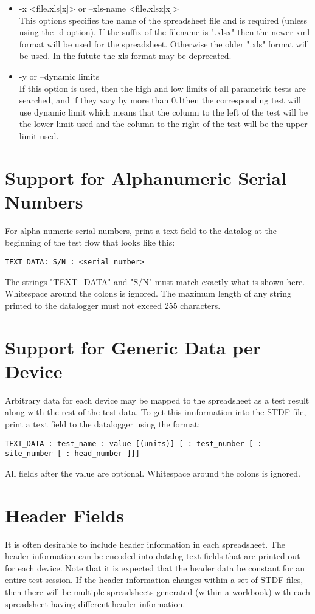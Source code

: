 \documentclass[letterpaper]{article}
\begin{document}
\begin{itemize}
\item -x <file.xls[x]> or --xls-name <file.xlsx[x]>\\
This options specifies the name of the spreadsheet file and is required (unless using the -d option).
If the suffix of the filename is ".xlsx" then the newer xml format will be used for the spreadsheet.
Otherwise the older ".xls" format will be used.  In the futute the xls format may be deprecated.
\item -y or --dynamic limits\\
If this option is used, then the high and low limits of all parametric tests are
searched, and if they vary by more than 0.1\percent then the corresponding test will use dynamic limit
which means that the column to the left of the test will be the lower limit used and the column to
the right of the test will be the upper limit used.
\end{itemize}
\clearpage
\section{Support for Alphanumeric Serial Numbers}
For alpha-numeric serial numbers, print a text field to the datalog
at the beginning of the test flow that looks like this:

\begin{verbatim}
TEXT_DATA: S/N : <serial_number>
\end{verbatim}
The strings "TEXT\_DATA" and "S/N" must match exactly what is shown here.  Whitespace
around the colons is ignored.  The maximum length of any string printed to the datalogger
must not exceed 255 characters.

\section{Support for Generic Data per Device}
Arbitrary data for each device may be mapped to the spreadsheet as a test result along
with the rest of the test data.  To get this innformation into the STDF file, print a 
text field to the datalogger using the format:
\begin{verbatim}
TEXT_DATA : test_name : value [(units)] [ : test_number [ : site_number [ : head_number ]]]
\end{verbatim}
All fields after the value are optional.  Whitespace around the colons is ignored.

\section{Header Fields}
It is often desirable to include header information in each spreadsheet.  The header information
can be encoded into datalog text fields that are printed out for each device.  Note that it is
expected that the header data be constant for an entire test session.  If the header information
changes within a set of STDF files, then there will be multiple spreadsheets generated (within a workbook)
with each spreadsheet having different header information.
\end{document}

